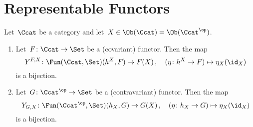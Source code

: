 \section{Representable Functors}


\begin{lemma}
  \label{yoneda lemma}
  Let~$\Ccat$ be a category and let~$X \in \Ob(\Ccat) = \Ob(\Ccat^\op)$.
  \begin{enumerate}
    \item
      \label{covariant yoneda}
      Let~$F \colon \Ccat \to \Set$ be a (covariant) functor.
      Then the map
      \[
                Y^{F,X}
        \colon  \Fun(\Ccat, \Set)(h^X, F)
        \to     F(X) \,,
        \quad   ( \eta \colon h^X \to F)
        \mapsto \eta_X(\id_X)
      \]
      is a bijection.
    \item
      \label{contravariant yoneda}
      Let~$G \colon \Ccat^\op \to \Set$ be a (contravariant) functor.
      Then the map
      \[
                Y_{G,X}
        \colon  \Fun(\Ccat^\op, \Set)(h_X, G)
        \to     G(X) \,,
        \quad   ( \eta \colon h_X \to G)
        \mapsto \eta_X(\id_X)
      \]
      is a bijection.
  \end{enumerate}
\end{lemma}


